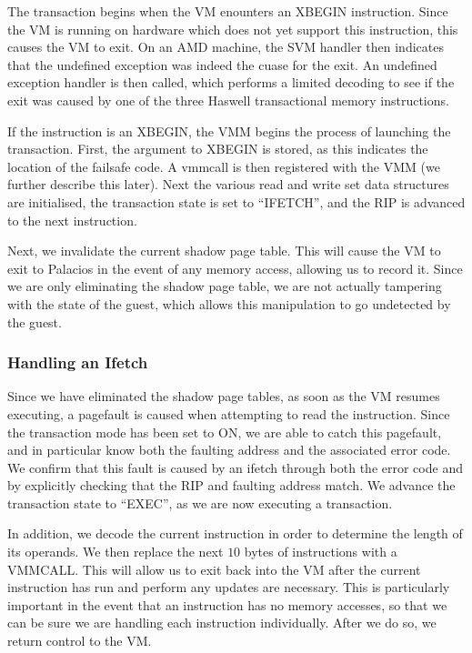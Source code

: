 \documentclass{acm_proc_article-sp}
\begin{document}
The transaction begins when the VM enounters an XBEGIN instruction. Since the 
VM is running on hardware which does not yet support this instruction, this
causes the VM to exit. On an AMD machine, the SVM handler then indicates that
the undefined exception was indeed the cuase for the exit. An undefined 
exception handler is then called, which performs a limited decoding to see
if the exit was caused by one of the three Haswell transactional memory
instructions.    

If the instruction is an XBEGIN, the VMM begins the process of launching the
transaction. First, the argument to XBEGIN is stored, as this indicates the 
location of the failsafe code. A vmmcall is then registered with the VMM
(we further describe this later). Next the various read and write set data
structures are initialised, the transaction state is set to ``IFETCH'', and the
RIP is advanced to the next instruction.

Next, we invalidate the current shadow page table. This will cause the VM to 
exit to Palacios in the event of any memory access, allowing us to record it.
Since we are only eliminating the shadow page table, we are not actually
tampering with the state of the guest, which allows this manipulation to go
undetected by the guest.

\subsubsection{Handling an Ifetch}

Since we have eliminated the shadow page tables, as soon as the VM resumes
executing, a pagefault is caused when attempting to read the instruction.
Since the transaction mode has been set to ON, we are able to catch this
pagefault, and in particular know both the faulting address and the associated
error code. We confirm that this fault is caused by an ifetch through both
the error code and by explicitly checking that the RIP and faulting address
match. We advance the transaction state to ``EXEC'', as we are now executing
a transaction. 
  
In addition, we decode the current instruction in order to determine the length
of its operands. We then replace the next $10$ bytes of instructions with
a VMMCALL. This will allow us to exit back into the VM after the current
instruction has run and perform any updates are necessary. This is particularly
important in the event that an instruction has no memory accesses, so that we
can be sure we are handling each instruction individually. After we do so, 
we return control to the VM.
\end{document}
